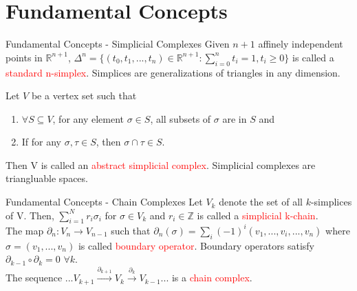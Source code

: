 \documentclass{beamer}
\begin{document}
\section{Fundamental Concepts}
\begin{frame}{Fundamental Concepts - Simplicial Complexes}
    Given $n+1$ affinely independent points in $\mathbb{R}^{n+1}$, $\Delta^{n} = \{(t_0,t_1,...,t_n)\in \mathbb{R}^{n+1} : \sum\limits_{i=0}^{n}t_i=1, t_i \geq 0\}$
    is called a \textcolor{red}{standard n-simplex}. Simplices are generalizations of triangles in any dimension.

    \vspace{0.5cm}
    Let $V$ be a vertex set such that 
    \begin{enumerate}
        \item $\forall S\subseteq V$, for any element $\sigma \in S$, all subsets of $\sigma$ are in $S$ and
        \item If for any $\sigma,\tau \in S$, then $\sigma \cap \tau \in S$.
    \end{enumerate}
    Then V is called an \textcolor{red}{abstract simplicial complex}. Simplicial complexes are triangluable spaces. 

\end{frame}


\begin{frame}{Fundamental Concepts - Chain Complexes}
    Let $V_k$ denote the set of all $k$-simplices of V. Then, $\sum\limits_{i=1}^Nr_i\sigma_i$ for $\sigma \in V_k$ and $r_i \in \mathbb{Z}$ is called a \textcolor{red}{simplicial k-chain}. \\

    \vspace{0.5cm}
    The map $\partial_n: V_n \rightarrow V_{n-1}$ such that 
    $\partial_n(\sigma) = \sum\limits_{i}(-1)^i(v_1,...,\hat{v_i},...,v_n)$
    where $\sigma = (v_1,...,v_n)$ is called \textcolor{red}{boundary operator}. Boundary operators satisfy $\partial_{k-1}\circ \partial_{k}=0$  $\forall k$.\\

    \vspace{0.5cm}
    The sequence $...V_{k+1} \xrightarrow{\partial_{k+1}} V_k \xrightarrow{\partial_{k}} V_{k-1}...$ is a \textcolor{red}{chain complex}.
    
\end{frame}
\end{document}
